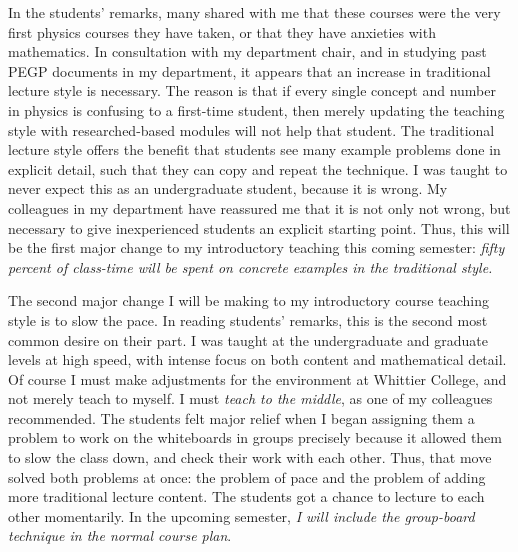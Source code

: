 \documentclass[../../main.tex]{subfiles}
\begin{document}
In the students' remarks, many shared with me that these courses were the very first physics courses they have taken, or that they have anxieties with mathematics.  In consultation with my department chair, and in studying past PEGP documents in my department, it appears that an increase in traditional lecture style is necessary.  The reason is that if every single concept and number in physics is confusing to a first-time student, then merely updating the teaching style with researched-based modules will not help that student.  The traditional lecture style offers the benefit that students see many example problems done in explicit detail, such that they can copy and repeat the technique.  I was taught to never expect this as an undergraduate student, because it is wrong.  My colleagues in my department have reassured me that it is not only not wrong, but necessary to give inexperienced students an explicit starting point.  Thus, this will be the first major change to my introductory teaching this coming semester: \textit{fifty percent of class-time will be spent on concrete examples in the traditional style.} \\ \hspace{0.1cm}

The second major change I will be making to my introductory course teaching style is to slow the pace.  In reading students' remarks, this is the second most common desire on their part.  I was taught at the undergraduate and graduate levels at high speed, with intense focus on both content and mathematical detail.  Of course I must make adjustments for the environment at Whittier College, and not merely teach to myself.  I must \textit{teach to the middle}, as one of my colleagues recommended.  The students felt major relief when I began assigning them a problem to work on the whiteboards in groups precisely because it allowed them to slow the class down, and check their work with each other.  Thus, that move solved both problems at once: the problem of pace and the problem of adding more traditional lecture content.  The students got a chance to lecture to each other momentarily.  In the upcoming semester, \textit{I will include the group-board technique in the normal course plan}. \\ \hspace{0.1cm}
\end{document}
